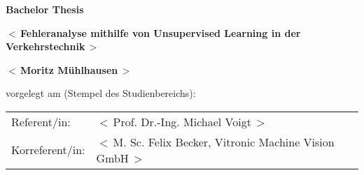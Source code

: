%

%
\newcommand{\Bearbeiter}{$<\,$Moritz Mühlhausen$\,>$}
\newcommand{\Thema}{$<\,$Fehleranalyse mithilfe von Unsupervised Learning in der Verkehrstechnik$\,>$}
\newcommand{\Referent}{$<\,$Prof. Dr.-Ing. Michael Voigt$\,>$}
\newcommand{\Korreferent}{$<\,$M. Sc. Felix Becker, Vitronic Machine Vision GmbH$\,>$}
%
\thispagestyle{empty} 
%
\vspace{-20mm}
\begin{minipage}[t]{8cm}  
\end{minipage}
\hfill
{}
\vspace{30mm}
\begin{center}{\Huge\bf Bachelor Thesis} \par
\vspace{20mm} \baselineskip 35pt
{\LARGE\bf  \Thema} \par
\vspace{16mm}
{\LARGE\bf  \Bearbeiter} \par
\end{center}
% 
\vspace{15mm}
vorgelegt am (Stempel des Studienbereichs): \\
\vfill
\begin{tabular}{lp{382pt}}
Referent/in:	 &  \Referent \\[0.5ex]
Korreferent/in:	 &  \Korreferent 
\end{tabular}
